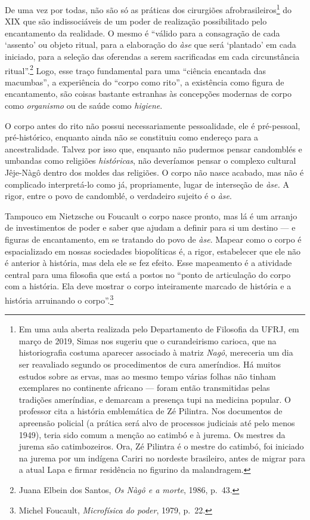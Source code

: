 De uma vez por todas, não são só as práticas dos cirurgiões
afrobrasileiros\footnote{Em uma aula aberta realizada pelo Departamento
  de Filosofia da UFRJ, em março de 2019, Simas nos sugeriu que o
  curandeirismo carioca, que na historiografia costuma aparecer
  associado à matriz \textit{Nagô}, mereceria um dia ser reavaliado
  segundo os procedimentos de cura ameríndios. Há muitos estudos sobre
  as ervas, mas ao mesmo tempo várias folhas não tinham exemplares no
  continente africano --- foram então transmitidas pelas tradições
  ameríndias, e demarcam a presença tupi na medicina popular. O
  professor cita a história emblemática de Zé Pilintra. Nos documentos
  de apreensão policial (a prática será alvo de processos judiciais até
  pelo menos 1949), teria sido comum a menção ao catimbó e à jurema. Os
  mestres da jurema são catimbozeiros. Ora, Zé Pilintra é o mestre do
  catimbó, foi iniciado na jurema por um indígena Cariri no nordeste
  brasileiro, antes de migrar para a atual Lapa e firmar residência no
  figurino da malandragem.} do XIX que são indissociáveis de um poder de
realização possibilitado pelo encantamento da realidade. O mesmo é
``válido para a consagração de cada `assento' ou objeto ritual, para a
elaboração do \textit{àse} que será `plantado' em cada iniciado, para a
seleção das oferendas a serem sacrificadas em cada circunstância
ritual''.\footnote{Juana Elbein dos Santos, \textit{Os Nàgô e a morte},
  1986, p.~43.} Logo, esse traço fundamental para uma ``ciência
encantada das macumbas'', a experiência do ``corpo como rito'', a
existência como figura de encantamento, são coisas bastante estranhas às
concepções modernas de corpo como \textit{organismo} ou de saúde como
\textit{higiene}.

O corpo antes do rito não possui necessariamente pessoalidade, ele é
pré-pessoal, pré-histórico, enquanto ainda não se constituiu como
endereço para a ancestralidade. Talvez por isso que, enquanto não
pudermos pensar candomblés e umbandas como religiões \textit{históricas},
não deveríamos pensar o complexo cultural Jêje-Nàgô dentro dos moldes
das religiões. O corpo não nasce acabado, mas não é complicado
interpretá-lo como já, propriamente, lugar de interseção de \textit{àse.}
A rigor, entre o povo de candomblé, o verdadeiro sujeito é o \textit{àse}.

Tampouco em Nietzsche ou Foucault o corpo nasce pronto, mas lá é um
arranjo de investimentos de poder e saber que ajudam a definir para si
um destino --- e figuras de encantamento, em se tratando do povo de
\textit{àse}. Mapear como o corpo é espacializado em nossas sociedades
biopolíticas é, a rigor, estabelecer que ele não é anterior à história,
mas dela ele se fez efeito. Esse mapeamento é a atividade central para
uma filosofia que está a postos no ``ponto de articulação do corpo com a
história. Ela deve mostrar o corpo inteiramente marcado de história e a
história arruinando o corpo''.\footnote{Michel Foucault,
  \textit{Microfísica do poder}, 1979, p.~22.}

